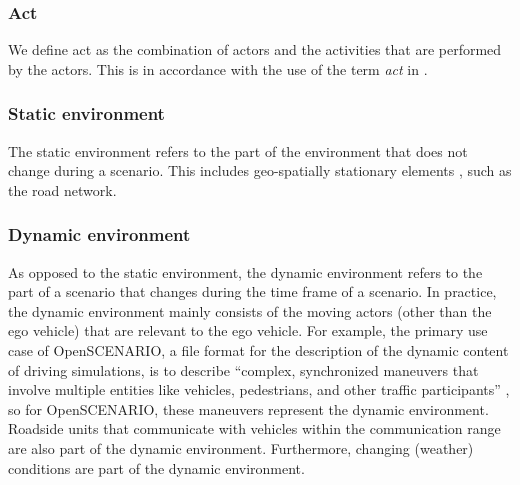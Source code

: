 

\subsubsection{Act}
\label{sec:act}

We define act as the combination of actors and the activities that are performed by the actors. %
This is in accordance with the use of the term \emph{act} in \autocite{openscenario}. 


\subsubsection{Static environment}
\label{sec:static environment}
The static environment refers to the part of the environment that does not change during a scenario. This includes geo-spatially stationary elements \autocite{ulbrich2015},  such as the road network.

\subsubsection{Dynamic environment}
\label{sec:dynamic environment}
As opposed to the static environment, the dynamic environment refers to the part of a scenario that changes during the time frame of a scenario. 
In practice, the dynamic environment mainly consists of the moving actors (other than the ego vehicle) that are relevant to the ego vehicle.
For example, the primary use case of OpenSCENARIO, a file format for the description of the dynamic content of driving simulations, is to describe ``complex, synchronized maneuvers that involve multiple entities like vehicles, pedestrians, and other traffic participants'' \autocite{openscenario}, so for OpenSCENARIO, these maneuvers represent the dynamic environment.
Roadside units that communicate with vehicles within the communication range \autocite{alsultan2014comprehensive} are also part of the dynamic environment. Furthermore, changing (weather) conditions are part of the dynamic environment.

